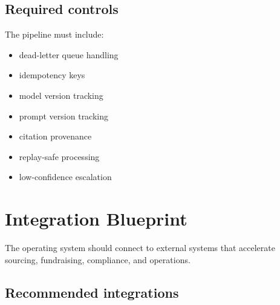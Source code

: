\documentclass[11pt]{article}
\begin{document}
\subsection{Required controls}

The pipeline must include:

\begin{itemize}
\item dead-letter queue handling
\item idempotency keys
\item model version tracking
\item prompt version tracking
\item citation provenance
\item replay-safe processing
\item low-confidence escalation
\end{itemize}

\section{Integration Blueprint}

The operating system should connect to external systems that accelerate sourcing, fundraising, compliance, and operations.

\subsection{Recommended integrations}
\end{document}
